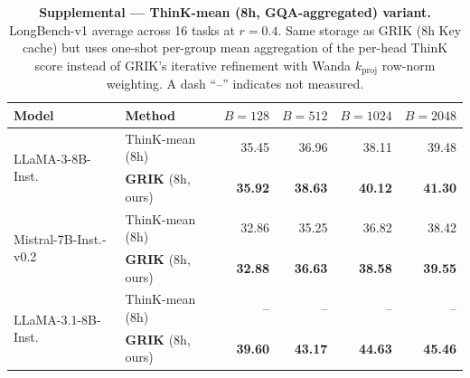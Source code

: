 \begin{table}[t]
\centering
\small
\setlength{\tabcolsep}{6pt}
\renewcommand{\arraystretch}{1.05}
\caption{\textbf{Supplemental — ThinK-mean (8h, GQA-aggregated) variant.}
LongBench-v1 average across 16 tasks at $r{=}0.4$. Same storage as GRIK
(8h Key cache) but uses one-shot per-group mean aggregation of the
per-head ThinK score instead of GRIK's iterative refinement with Wanda
$k_\text{proj}$ row-norm weighting.
A dash ``--'' indicates not measured.}
\label{tab:longbench-thinkmean}
\begin{tabular}{llrrrr}
\toprule
Model & Method & $B{=}128$ & $B{=}512$ & $B{=}1024$ & $B{=}2048$ \\
\midrule
\multirow{2}{*}{LLaMA-3-8B-Inst.}
 & ThinK-mean (8h)                        & 35.45 & 36.96 & 38.11 & 39.48 \\
 & \textbf{GRIK} (8h, ours)               & \textbf{35.92} & \textbf{38.63} & \textbf{40.12} & \textbf{41.30} \\
\midrule
\multirow{2}{*}{Mistral-7B-Inst.-v0.2}
 & ThinK-mean (8h)                        & 32.86 & 35.25 & 36.82 & 38.42 \\
 & \textbf{GRIK} (8h, ours)               & \textbf{32.88} & \textbf{36.63} & \textbf{38.58} & \textbf{39.55} \\
\midrule
\multirow{2}{*}{LLaMA-3.1-8B-Inst.}
 & ThinK-mean (8h)                        & --    & --    & --    & --    \\
 & \textbf{GRIK} (8h, ours)               & \textbf{39.60} & \textbf{43.17} & \textbf{44.63} & \textbf{45.46} \\
\bottomrule
\end{tabular}
\end{table}



